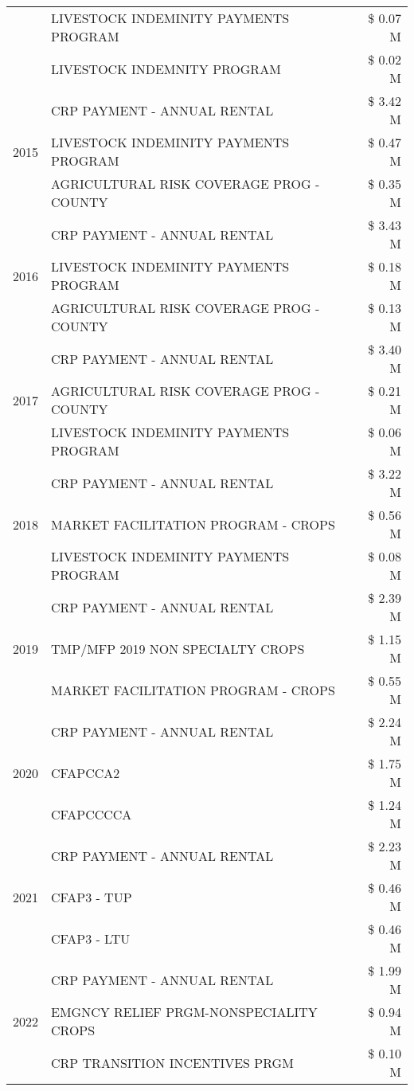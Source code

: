 \begin{tabular}{llr}
 & LIVESTOCK INDEMINITY PAYMENTS PROGRAM & \$ 0.07 M \\
 & LIVESTOCK INDEMNITY PROGRAM & \$ 0.02 M \\
\cline{1-3}
\multirow[t]{3}{*}{2015} & CRP PAYMENT - ANNUAL RENTAL & \$ 3.42 M \\
 & LIVESTOCK INDEMINITY PAYMENTS PROGRAM & \$ 0.47 M \\
 & AGRICULTURAL RISK COVERAGE PROG - COUNTY & \$ 0.35 M \\
\cline{1-3}
\multirow[t]{3}{*}{2016} & CRP PAYMENT - ANNUAL RENTAL & \$ 3.43 M \\
 & LIVESTOCK INDEMINITY PAYMENTS PROGRAM & \$ 0.18 M \\
 & AGRICULTURAL RISK COVERAGE PROG - COUNTY & \$ 0.13 M \\
\cline{1-3}
\multirow[t]{3}{*}{2017} & CRP PAYMENT - ANNUAL RENTAL & \$ 3.40 M \\
 & AGRICULTURAL RISK COVERAGE PROG - COUNTY & \$ 0.21 M \\
 & LIVESTOCK INDEMINITY PAYMENTS PROGRAM & \$ 0.06 M \\
\cline{1-3}
\multirow[t]{3}{*}{2018} & CRP PAYMENT - ANNUAL RENTAL & \$ 3.22 M \\
 & MARKET FACILITATION PROGRAM - CROPS & \$ 0.56 M \\
 & LIVESTOCK INDEMINITY PAYMENTS PROGRAM & \$ 0.08 M \\
\cline{1-3}
\multirow[t]{3}{*}{2019} & CRP PAYMENT - ANNUAL RENTAL & \$ 2.39 M \\
 & TMP/MFP 2019 NON SPECIALTY CROPS & \$ 1.15 M \\
 & MARKET FACILITATION PROGRAM - CROPS & \$ 0.55 M \\
\cline{1-3}
\multirow[t]{3}{*}{2020} & CRP PAYMENT - ANNUAL RENTAL & \$ 2.24 M \\
 & CFAPCCA2 & \$ 1.75 M \\
 & CFAPCCCCA & \$ 1.24 M \\
\cline{1-3}
\multirow[t]{3}{*}{2021} & CRP PAYMENT - ANNUAL RENTAL & \$ 2.23 M \\
 & CFAP3 - TUP & \$ 0.46 M \\
 & CFAP3 - LTU & \$ 0.46 M \\
\cline{1-3}
\multirow[t]{3}{*}{2022} & CRP PAYMENT - ANNUAL RENTAL & \$ 1.99 M \\
 & EMGNCY RELIEF PRGM-NONSPECIALITY CROPS & \$ 0.94 M \\
 & CRP TRANSITION INCENTIVES PRGM & \$ 0.10 M \\
\cline{1-3}
\bottomrule
\end{tabular}
